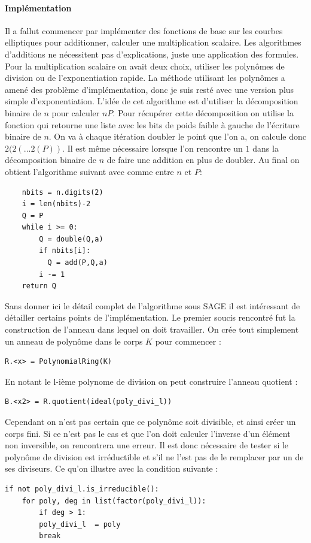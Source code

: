 \documentclass{article}
\begin{document}
\paragraph*{Implémentation}
Il a fallut commencer par implémenter des fonctions de base sur les courbes elliptiques pour additionner, calculer une multiplication scalaire. Les algorithmes d'additions ne nécessitent pas d'explications, juste une application des formules. Pour la multiplication scalaire on avait deux choix, utiliser les polynômes de division ou de l'exponentiation rapide. La méthode utilisant les polynômes a amené des problème d'implémentation, donc je suis resté avec une version plus simple d'exponentiation. L'idée de cet algorithme est d'utiliser la décomposition binaire de $n$ pour calculer $nP$. Pour récupérer cette décomposition on utilise la fonction  qui retourne une liste avec les bits de poids faible à gauche de l'écriture binaire de $n$. On va à chaque itération doubler le point que l'on a, on calcule donc $2(2(\ldots2(P))$. Il est même nécessaire lorsque l'on rencontre un $1$ dans la décomposition binaire de $n$ de faire une addition en plus de doubler. Au final on obtient l'algorithme suivant avec comme entre $n$ et $P$: 
\bigskip
\begin{lstlisting}
    nbits = n.digits(2)
    i = len(nbits)-2
    Q = P
    while i >= 0:
        Q = double(Q,a)
        if nbits[i]:
          Q = add(P,Q,a)
        i -= 1
    return Q
\end{lstlisting}
\bigskip

Sans donner ici le détail complet de l'algorithme sous SAGE il est intéressant de détailler certains points de l'implémentation. Le premier soucis rencontré fut la construction de l'anneau dans lequel on doit travailler. On crée tout simplement un anneau de polynôme dans le corps $K$ pour commencer :
\bigskip
\begin{lstlisting}
R.<x> = PolynomialRing(K)
\end{lstlisting}
\bigskip
En notant  le l-ième polynome de division on peut construire l'anneau quotient : 
\bigskip

\begin{lstlisting}
B.<x2> = R.quotient(ideal(poly_divi_l))
\end{lstlisting}
\bigskip
Cependant on n'est pas certain que ce polynôme soit divisible, et ainsi créer un corps fini. Si ce n'est pas le cas et que l'on doit calculer l'inverse d'un élément non inversible, on rencontrera une erreur. Il est donc nécessaire de tester si le polynôme de division est irréductible et s'il ne l'est pas de le remplacer par un de ses diviseurs. Ce qu'on illustre avec la condition suivante :
\bigskip
\begin{lstlisting}
if not poly_divi_l.is_irreducible():      
	for poly, deg in list(factor(poly_divi_l)):
		if deg > 1:
		poly_divi_l  = poly
		break
\end{lstlisting}
\bigskip
\end{document}
